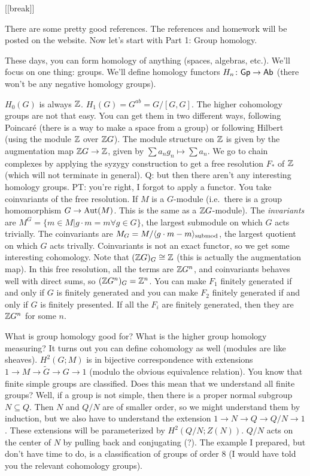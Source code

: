 [[break]]

There are some pretty good references. The references and homework will be posted on the website. Now let's start with Part 1: Group homology.


These days, you can form homology of anything (spaces, algebras, etc.). We'll focus on one thing: groups. We'll define homology functors $H_n\colon \text{\sf Gp}\to \text{\sf Ab}$ (there won't be any negative homology groups).

$H_0(G)$ is always $\mathbb{Z}$. $H_1(G)=G^{ab}=G/[G,G]$. The higher cohomology groups are not that easy. You can get them in two different ways, following Poincar\'e (there is a way to make a space from a group) or following Hilbert (using the module $\mathbb{Z}$ over $\mathbb{Z} G$). The module structure on $\mathbb{Z}$ is given by the augmentation map $\mathbb{Z} G\to \mathbb{Z}$, given by $\sum a_n g_n\mapsto \sum a_n$. We go to chain complexes by applying the syzygy construction to get a free resolution $F_*$ of $\mathbb{Z}$ (which will not terminate in general). Q: but then there aren't any interesting homology groups. PT: you're right, I forgot to apply a functor. You take coinvariants of the free resolution. If $M$ is a $G$-module (i.e.~there is a group homomorphism $G\to \operatorname{Aut}(M)$. This is the same as a $\mathbb{Z} G$-module). The \emph{invariants} are $M^G=\{m\in M|g\cdot m=m \forall g\in G\}$, the largest submodule on which $G$ acts trivially. The coinvariants are $M_G=M/\langle g\cdot m-m\rangle_{\text{submod}}$, the largest quotient on which $G$ acts trivally. Coinvariants is not an exact functor, so we get some interesting cohomology. Note that $(\mathbb{Z} G)_G\cong \mathbb{Z}$ (this is actually the augmentation map). In this free resolution, all the terms are $\mathbb{Z} G^n$, and coinvariants behaves well with direct sums, so $(\mathbb{Z} G^n)_G=\mathbb{Z}^n$. You can make $F_1$ finitely generated if and only if $G$ is finitely generated and you can make $F_2$ finitely generated if and only if $G$ is finitely presented. If all the $F_i$ are finitely generated, then they are $\mathbb{Z} G^n$ for some $n$.

What is group homology good for? What is the higher group homology measuring? It turns out you can define cohomology as well (modules are like sheaves). $H^2(G;M)$ is in bijective correspondence with extensions $1\to M\to \tilde G\to G\to 1$ (modulo the obvious equivalence relation). You know that finite simple groups are classified. Does this mean that we understand all finite groups? Well, if a group is not simple, then there is a proper normal subgroup $N\subseteq Q$. Then $N$ and $Q/N$ are of smaller order, so we might understand them by induction, but we also have to understand the extension $1\to N\to Q\to Q/N\to 1$. These extensions will be parameterized by $H^2(Q/N;Z(N))$. $Q/N$ acts on the center of $N$ by pulling back and conjugating (?). The example I prepared, but don't have time to do, is a classification of groups of order $8$ (I would have told you the relevant cohomology groups).

